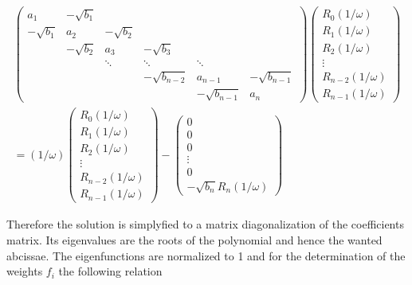 \begin{equation}
 \begin{split}
 \begin{pmatrix}
a_1        & -\sqrt{b_1}&            &                &             &          \\
-\sqrt{b_1}& a_2        & -\sqrt{b_2}&                &             &          \\
           & -\sqrt{b_2}& a_3        & -\sqrt{b_3}    &             &          \\
           &            & \ddots     & \ddots         & \ddots      &          \\
           &            &            & -\sqrt{b_{n-2}}& a_{n-1}     & -\sqrt{b_{n-1}}\\
           &            &            &                & -\sqrt{b_{n-1}}& a_n   
 \end{pmatrix}
 \begin{pmatrix}
  R_0(1/\omega)\\
  R_1(1/\omega)\\
  R_2(1/\omega)\\
  \vdots\\
  R_{n-2}(1/\omega)\\
  R_{n-1}(1/\omega)
 \end{pmatrix}         \\
 = (1/\omega)
 \begin{pmatrix}
  R_0(1/\omega)\\
  R_1(1/\omega)\\
  R_2(1/\omega)\\
  \vdots\\
  R_{n-2}(1/\omega)\\
  R_{n-1}(1/\omega)
 \end{pmatrix}
 -
 \begin{pmatrix}
  0\\
  0\\
  0\\
  \vdots\\
  0\\
  -\sqrt{b_n} R_{n}(1/\omega)
 \end{pmatrix}
 \end{split}
\end{equation}

Therefore the solution is simplyfied to a matrix diagonalization
of the coefficients matrix. Its eigenvalues are the roots of the polynomial
and hence the wanted abcissae. The eigenfunctions are normalized to 1 and for the
determination of the weights $f_i$ the following relation 

